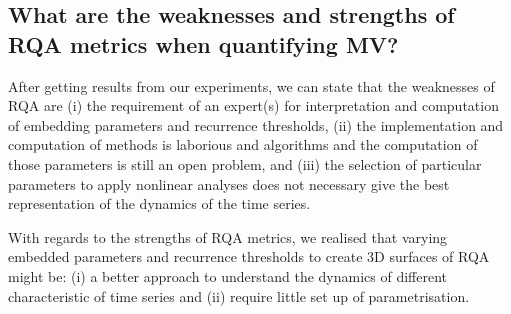  
%

\subsection*{What are the weaknesses and strengths of RQA metrics 
	when quantifying MV?}


After getting results from our experiments, we can state that the 
weaknesses of RQA are (i) the requirement of an expert(s) for 
interpretation and computation of embedding parameters and 
recurrence thresholds,  
(ii) the implementation and computation of methods is 
laborious and algorithms and the computation of those parameters 
is still an open problem, and 
(iii) the selection of particular parameters to apply nonlinear analyses 
does not necessary give the best representation of the dynamics of 
the time series.

With regards to the strengths of RQA metrics, we realised that varying 
embedded parameters and recurrence thresholds to create 3D surfaces 
of RQA might be: 
(i) a better approach to understand the dynamics of different 
characteristic of time series and
(ii) require little set up of parametrisation.


%

